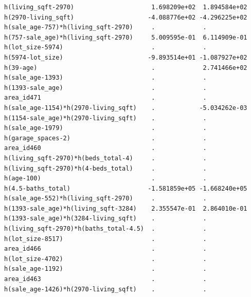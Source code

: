 \documentclass[
]{article}
\begin{document}
\begin{verbatim}
h(living_sqft-2970)                     1.698209e+02  1.894584e+02
h(2970-living_sqft)                    -4.088776e+02 -4.296225e+02
h(sale_age-757)*h(living_sqft-2970)     .             .           
h(757-sale_age)*h(living_sqft-2970)     5.009595e-01  6.114909e-01
h(lot_size-5974)                        .             .           
h(5974-lot_size)                       -9.893514e+01 -1.087927e+02
h(39-age)                               .             2.741466e+02
h(sale_age-1393)                        .             .           
h(1393-sale_age)                        .             .           
area_id471                              .             .           
h(sale_age-1154)*h(2970-living_sqft)    .            -5.034262e-03
h(1154-sale_age)*h(2970-living_sqft)    .             .           
h(sale_age-1979)                        .             .           
h(garage_spaces-2)                      .             .           
area_id460                              .             .           
h(living_sqft-2970)*h(beds_total-4)     .             .           
h(living_sqft-2970)*h(4-beds_total)     .             .           
h(age-100)                              .             .           
h(4.5-baths_total)                     -1.581859e+05 -1.668240e+05
h(sale_age-552)*h(living_sqft-2970)     .             .           
h(1393-sale_age)*h(living_sqft-3284)    2.355547e-01  2.864010e-01
h(1393-sale_age)*h(3284-living_sqft)    .             .           
h(living_sqft-2970)*h(baths_total-4.5)  .             .           
h(lot_size-8517)                        .             .           
area_id466                              .             .           
h(lot_size-4702)                        .             .           
h(sale_age-1192)                        .             .           
area_id463                              .             .           
h(sale_age-1426)*h(2970-living_sqft)    .             .           
                                                                  

\end{verbatim}
\end{document}
